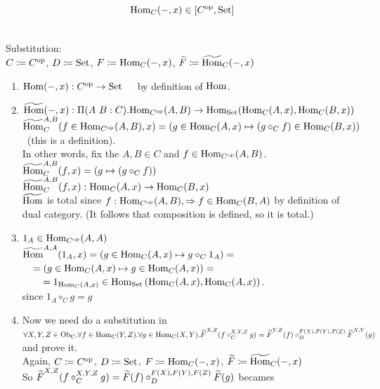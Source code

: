\documentclass[10pt,a4paper]{article}
\begin{document}
\begin{lemma}
$${\textrm{Hom}}_C(-, x) \in [C^{\textrm{op}},{\textrm{Set}}]$$
\end{lemma}

\myprf\\
Substitution:\\
$C \coloneqq C^{\textrm{op}}$, 
$D \coloneqq {\textrm{Set}}$, 
$F \coloneqq {\textrm{Hom}}_C(-,x)$, 
${\widetilde{F}\textrm{}} \coloneqq {\widetilde{{\textrm{Hom}}}\textrm{}}_C(-,x)$\\
\begin{enumerate}
\item ${\textrm{Hom}}(-, x) : C^{\textrm{op}} \to {\textrm{Set}}$\ \ \ by definition of ${\textrm{Hom}}$.
\item $\HomMor(-, x) :\Pi(A\ B:C).\Hom_{C^\op}(A,B) \to \Hom_\Set(\Hom_C(A,x), \Hom_C(B,x))$\\
${\widetilde{{\textrm{Hom}}}\textrm{}}_C^{A,B}(f\in{\textrm{Hom}}_{C^{\textrm{op}}}(A,B), x) = (g \in{\textrm{Hom}}_C(A,x) \mapsto (g \circ_C f) \in{\textrm{Hom}}_C(B,x))$\ (this is a definition).\\
In other words, fix the $A,B\in C$ and $f\in{\textrm{Hom}}_{C^{\textrm{op}}}(A,B)$.\\
${\widetilde{{\textrm{Hom}}}\textrm{}}_C^{A,B}(f, x) = (g\mapsto (g \circ_C f))$\\
${\widetilde{{\textrm{Hom}}}\textrm{}}_C^{A,B}(f, x) : {\textrm{Hom}}_C(A,x) \to {\textrm{Hom}}_C(B,x)$
\\
${\widetilde{{\textrm{Hom}}}\textrm{}}$ is total since $f:{\textrm{Hom}}_{C^{\textrm{op}}}(A,B), \Rightarrow f\in{\textrm{Hom}}_C(B,A)$ by definition of dual category. (It follows that composition is defined, so it is total.)
\item $1_A\in{\textrm{Hom}}_{C^{\textrm{op}}}(A,A)$\\
${\widetilde{{\textrm{Hom}}}\textrm{}}^{A,A}(1_A, x) = \left(g \in{\textrm{Hom}}_C(A,x)\mapsto g \circ_C 1_A\right) = $\\
$\quad = \left(g \in{\textrm{Hom}}_C(A,x) \mapsto g \in{\textrm{Hom}}_C(A,x)\right) =$\\
$\quad \quad = 1_{{\textrm{Hom}}_C(A,x)} \in {\textrm{Hom}}_{\textrm{Set}}\left({\textrm{Hom}}_C(A,x), {\textrm{Hom}}_C(A,x)\right).$\\
since $1_A \circ_C g = g$\\
\item Now we need do a substitution in
$\forall X,Y,Z \in {\textrm{Ob}}_C.\forall f\in{\textrm{Hom}}_C(Y,Z).\forall g\in{\textrm{Hom}}_C(X,Y). {\widetilde{F}\textrm{}}^{X,Z}(f\circ_C^{X,Y,Z} g)={\widetilde{F}\textrm{}}^{Y,Z}(f)\circ_D^{F(X),F(Y),F(Z)} {\widetilde{F}\textrm{}}^{X,Y}(g)$ and prove it.\\
Again, $C \coloneqq C^{\textrm{op}}$, 
$D \coloneqq {\textrm{Set}}$, 
$F \coloneqq {\textrm{Hom}}_C(-,x)$, 
${\widetilde{F}\textrm{}} \coloneqq {\widetilde{{\textrm{Hom}}}\textrm{}}_C(-,x)$\\
So ${\widetilde{F}\textrm{}}^{X,Z}(f\circ_C^{X,Y,Z} g)={\widetilde{F}\textrm{}}(f)\circ_D^{F(X),F(Y),F(Z)} {\widetilde{F}\textrm{}}(g)$ becames\\

\end{enumerate}
\end{document}
